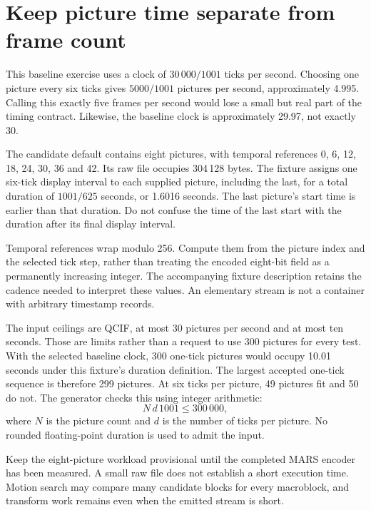 \section{Keep picture time separate from frame count}
This baseline exercise uses a clock of $30\,000/1001$ ticks per second. Choosing
one picture every six ticks gives $5000/1001$ pictures per second, approximately
4.995. Calling this exactly five frames per second would lose a small but real
part of the timing contract. Likewise, the baseline clock is approximately 29.97,
not exactly 30.

The candidate default contains eight pictures, with temporal references
0, 6, 12, 18, 24, 30, 36 and 42. Its raw file occupies 304\,128 bytes. The fixture
assigns one six-tick display interval to each supplied picture, including the
last, for a total duration of $1001/625$ seconds, or 1.6016 seconds. The last
picture's start time is earlier than that duration. Do not confuse the time of
the last start with the duration after its final display interval.

Temporal references wrap modulo 256. Compute them from the picture index and
the selected tick step, rather than treating the encoded eight-bit field as a
permanently increasing integer. The accompanying fixture description retains
the cadence needed to interpret these values. An elementary stream is not a
container with arbitrary timestamp records.

The input ceilings are QCIF, at most 30 pictures per second and at most ten
seconds. Those are limits rather than a request to use 300 pictures for every
test. With the selected baseline clock, 300 one-tick pictures would occupy
10.01 seconds under this fixture's duration definition. The largest accepted
one-tick sequence is therefore 299 pictures. At six ticks per picture, 49 pictures
fit and 50 do not. The generator checks this using integer arithmetic:
\[
  N\,d\,1001 \leq 300\,000,
\]
where $N$ is the picture count and $d$ is the number of ticks per picture. No
rounded floating-point duration is used to admit the input.

Keep the eight-picture workload provisional until the completed MARS encoder has
been measured. A small raw file does not establish a short execution time. Motion
search may compare many candidate blocks for every macroblock, and transform
work remains even when the emitted stream is short.
